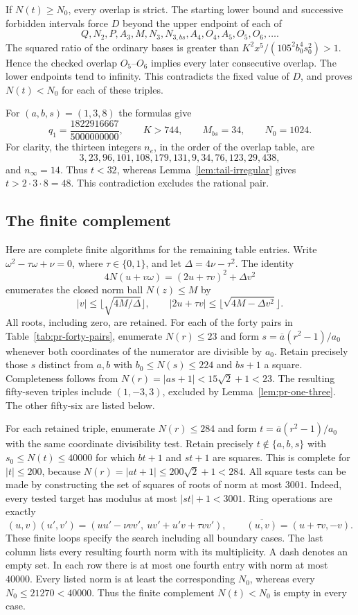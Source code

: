 \documentclass[12pt]{article}
\numberwithin{equation}{section}
\begin{document}
If $N(t)\ge N_0$, every overlap is strict. The starting lower bound
and successive forbidden intervals force $D$ beyond the upper endpoint
of each of
\[
 Q,N_2,P,A_3,M,N_3,N_{3,bs},A_4,O_4,A_5,O_5,O_6,\ldots.
\]
The squared ratio of the ordinary bases is greater than
$K^2x^5/(105^2b_0^4s_0^2)>1$. Hence the checked overlap
$O_5$--$O_6$ implies every later consecutive overlap. The lower
endpoints tend to infinity. This contradicts the fixed value of $D$,
and proves $N(t)<N_0$ for each of these triples.

For $(a,b,s)=(1,3,8)$ the formulas give
\[
 q_1=\frac{1822916667}{5000000000},\qquad K>744,\qquad
 M_{bs}=34,\qquad N_0=1024.
\]
For clarity, the thirteen integers $n_e$, in the order of the overlap
table, are
\[
 3,23,96,101,108,179,131,9,34,76,123,29,438,
\]
and $n_\infty=14$. Thus $t<32$, whereas
Lemma~\ref{lem:tail-irregular} gives $t>2\cdot3\cdot8=48$.
This contradiction excludes the rational pair.

\subsection{The finite complement}

Here are complete finite algorithms for the remaining table entries.
Write $\omega^2-\tau\omega+\nu=0$, where $\tau\in\{0,1\}$,
and let $\Delta=4\nu-\tau^2$. The identity
\[
 4N(u+v\omega)=(2u+\tau v)^2+\Delta v^2
\]
enumerates the closed norm ball $N(z)\le M$ by
\[
 |v|\le\lfloor\sqrt{4M/\Delta}\rfloor,\qquad
 |2u+\tau v|\le\lfloor\sqrt{4M-\Delta v^2}\rfloor.
\]
All roots, including zero, are retained. For each of the forty pairs
in Table~\ref{tab:pr-forty-pairs}, enumerate $N(r)\le23$ and form
$s=\overline a(r^2-1)/a_0$ whenever both coordinates of the numerator
are divisible by $a_0$. Retain precisely those $s$ distinct from $a,b$
with $b_0\le N(s)\le224$ and $bs+1$ a square.
Completeness follows from $N(r)=|as+1|<15\sqrt2+1<23$.
The resulting fifty-seven triples include $(1,-3,3)$, excluded by
Lemma~\ref{lem:pr-one-three}. The other fifty-six are listed below.

For each retained triple, enumerate $N(r)\le284$ and form
$t=\overline a(r^2-1)/a_0$ with the same coordinate divisibility test.
Retain precisely $t\notin\{a,b,s\}$ with $s_0\le N(t)\le40000$
for which $bt+1$ and $st+1$ are squares.
This is complete for $|t|\le200$, because
$N(r)=|at+1|\le200\sqrt2+1<284$.
All square tests can be made by constructing the set of squares of
roots of norm at most $3001$. Indeed, every tested target has
modulus at most $|st|+1<3001$. Ring operations are exactly
\[
 (u,v)(u',v')=(uu'-\nu vv',\ uv'+u'v+\tau vv'),\qquad
 \overline{(u,v)}=(u+\tau v,-v).
\]
These finite loops specify the search including all boundary cases.
The last column lists every resulting fourth norm with its multiplicity.
A dash denotes an empty set. In each row there is at most one fourth entry with norm at most $40000$. Every listed norm is at least the corresponding
$N_0$, whereas every $N_0\le21270<40000$.
Thus the finite complement $N(t)<N_0$ is empty in every case.
\end{document}
